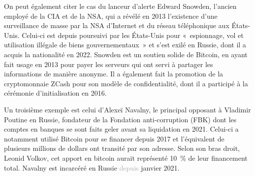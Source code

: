 On peut également citer le cas du lanceur d'alerte Edward Snowden, l'ancien employé de la CIA et de la NSA, qui a révélé en 2013 l'existence d'une surveillance de masse par la NSA d'Internet et du réseau téléphonique aux États-Unis. Celui-ci est depuis poursuivi par les États-Unis pour «~espionnage, vol et utilisation illégale de biens gouvernementaux~» et s'est exilé en Russie, dont il a acquis la nationalité en 2022. Snowden est un soutien solide de Bitcoin, en ayant fait usage en 2013 pour payer les serveurs qui ont servi à partager les informations de manière anonyme. Il a également fait la promotion de la cryptomonnaie ZCash pour son modèle de confidentialité, dont il a participé à la cérémonie d'initialisation en 2016.

Un troisième exemple est celui d'Alexeï Navalny, le principal opposant à Vladimir Poutine en Russie, fondateur de la Fondation anti-corruption (FBK) dont les comptes en banques se sont faits geler avant sa liquidation en 2021. Celui-ci a notamment utilisé Bitcoin pour se financer depuis 2017 et l'équivalent de plusieurs millions de dollars ont transité par son adresse. Selon son bras droit, Leonid Volkov, cet apport en bitcoin aurait représenté 10~\% de leur financement total. Navalny est incarcéré en Russie \textcolor{darkgray}{depuis} janvier 2021.


